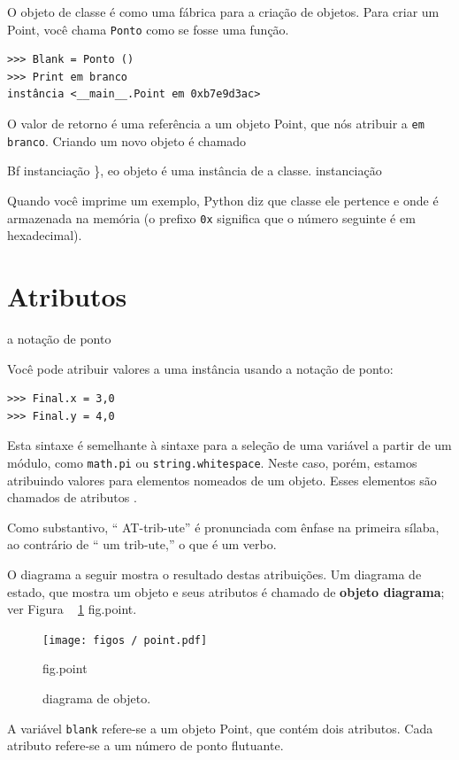 \documentclass[10pt]{book}
\begin{document}
\begin{v erbatim}
O objeto de classe é como uma fábrica para a criação de objetos. Para criar um
Point, você chama {\tt Ponto} como se fosse uma função.

\begin{verbatim}
>>> Blank = Ponto ()
>>> Print em branco
instância <__main__.Point em 0xb7e9d3ac>
\end{verbatim}
%
O valor de retorno é uma referência a um objeto Point, que nós
atribuir a {\tt em branco}.  
Criando um novo objeto é chamado
{Bf instanciação \}, eo objeto é uma instância {\bf} de
a classe.
\index{} instanciação

Quando você imprime um exemplo, Python diz que classe ele
pertence e onde é armazenada na memória (o prefixo
{\tt 0x} significa que o número seguinte é em hexadecimal).


\section{Atributos}
\label{atributos}
\index{} a notação de ponto

Você pode atribuir valores a uma instância usando a notação de ponto:

\begin{verbatim}
>>> Final.x = 3,0
>>> Final.y = 4,0
\end{verbatim}
%
Esta sintaxe é semelhante à sintaxe para a seleção de uma variável a partir de um
módulo, como {\tt math.pi} ou {\tt string.whitespace}. Neste caso,
porém, estamos atribuindo valores para elementos nomeados de um objeto.
Esses elementos são chamados de atributos {\bf}.

Como substantivo, `` AT-trib-ute'' é pronunciada com ênfase na primeira
sílaba, ao contrário de `` um trib-ute,'' o que é um verbo.

O diagrama a seguir mostra o resultado destas atribuições.
Um diagrama de estado, que mostra um objeto e seus atributos é
chamado de {\bf objeto diagrama}; ver Figura ~ \ref {} fig.point.

\begin{figure}
\centerline
{\texttt{[image: figos / point.pdf]}}
\caption{diagrama de objeto.}
\label{} fig.point
\end{figure}


A variável {\tt blank} refere-se a um objeto Point, que
contém dois atributos. Cada atributo refere-se a um
número de ponto flutuante.

}
\end{v erbatim}
\end{document}

